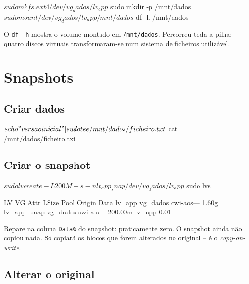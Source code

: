 \documentclass[11pt,a4paper]{article}
\begin{document}
\begin{terminal}
$ sudo mkfs.ext4 /dev/vg_dados/lv_app
$ sudo mkdir -p /mnt/dados
$ sudo mount /dev/vg_dados/lv_app /mnt/dados
$ df -h /mnt/dados
\end{terminal}

\begin{verificar}
O \texttt{df -h} mostra o volume montado em \texttt{/mnt/dados}. Percorreu toda a pilha: quatro discos virtuais transformaram-se num sistema de ficheiros utilizável.
\end{verificar}

\section{Snapshots}

\subsection{Criar dados}

\begin{terminal}
$ echo "versao inicial" | sudo tee /mnt/dados/ficheiro.txt
$ cat /mnt/dados/ficheiro.txt
\end{terminal}

\subsection{Criar o snapshot}

\begin{terminal}
$ sudo lvcreate -L 200M -s -n lv_app_snap /dev/vg_dados/lv_app
$ sudo lvs
\end{terminal}

\begin{saida}
  LV          VG       Attr       LSize   Pool Origin Data%
  lv_app      vg_dados owi-aos---   1.60g
  lv_app_snap vg_dados swi-a-s--- 200.00m      lv_app  0.01
\end{saida}

\begin{nota}
Repare na coluna \texttt{Data\%} do snapshot: praticamente zero. O snapshot ainda não copiou nada. Só copiará os blocos que forem alterados no original -- é o \emph{copy-on-write}.
\end{nota}

\subsection{Alterar o original}
\end{document}
